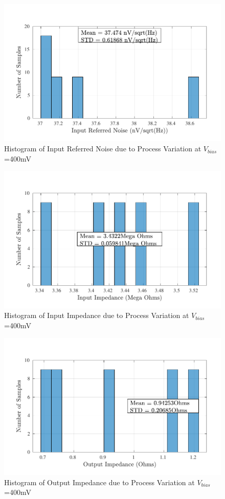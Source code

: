\begin{figure} [H]
\centering
\includegraphics[scale=1]{Figures/Corners/Overall/Proc_Mid/PDFs/Proc_Mid_irn.pdf}
\caption{Histogram of Input Referred Noise due to Process Variation at $V_{bias}$=400mV}
\end{figure}

\begin{figure} [H]
\centering
\includegraphics[scale=1]{Figures/Corners/Overall/Proc_Mid/PDFs/Proc_Mid_zin.pdf}
\caption{Histogram of Input Impedance due to Process Variation at $V_{bias}$=400mV}
\end{figure}

\begin{figure} [H]
\centering
\includegraphics[scale=1]{Figures/Corners/Overall/Proc_Mid/PDFs/Proc_Mid_zout.pdf}
\caption{Histogram of Output Impedance due to Process Variation at $V_{bias}$=400mV}
\end{figure}

